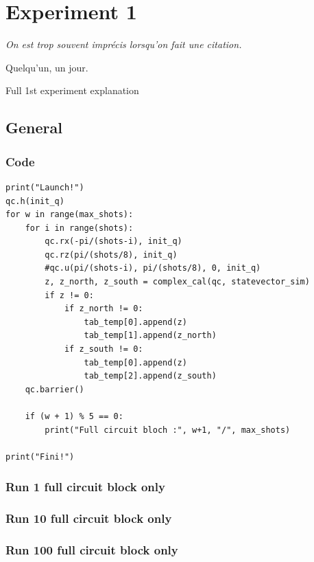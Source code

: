\chapter{Experiment 1}

\epigraph{\textit{On est trop souvent imprécis lorsqu'on fait une citation.}}{Quelqu'un, un jour.}

Full 1st experiment explanation

\section{General}

\subsection{Code}
\begin{lstlisting}
print("Launch!")
qc.h(init_q)
for w in range(max_shots):
    for i in range(shots):
        qc.rx(-pi/(shots-i), init_q)
        qc.rz(pi/(shots/8), init_q)
        #qc.u(pi/(shots-i), pi/(shots/8), 0, init_q)
        z, z_north, z_south = complex_cal(qc, statevector_sim)
        if z != 0:
            if z_north != 0:
                tab_temp[0].append(z)
                tab_temp[1].append(z_north)
            if z_south != 0:
                tab_temp[0].append(z)
                tab_temp[2].append(z_south)
    qc.barrier()
    
    if (w + 1) % 5 == 0:
        print("Full circuit bloch :", w+1, "/", max_shots)

print("Fini!")
\end{lstlisting}

\subsection{Run 1 full circuit block only}

\subsection{Run 10 full circuit block only}

\subsection{Run 100 full circuit block only}

